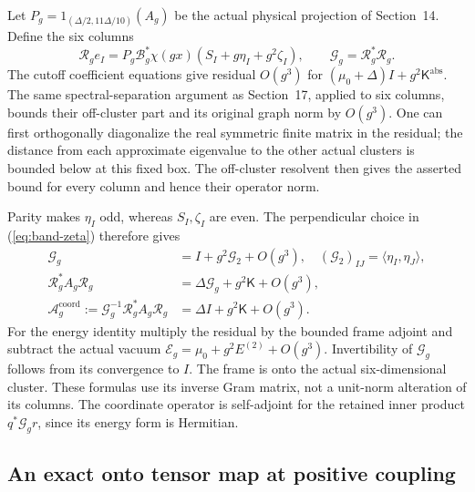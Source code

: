 Let $P_g=1_{(\Delta/2,11\Delta/10)}(A_g)$ be the actual physical
projection of Section~14. Define the six columns
\begin{equation}\label{eq:band-raw-frame}
 \mathcal R_g e_I=P_g\mathcal B_g^*\chi(gx)
                         (S_I+g\eta_I+g^2\zeta_I),\qquad
 \mathcal G_g=\mathcal R_g^*\mathcal R_g.
\end{equation}
The cutoff coefficient equations give residual $O(g^3)$ for
$(\mu_0+\Delta)I+g^2\mathsf K^{\mathrm{abs}}$.
The same spectral-separation argument as Section~17, applied to
six columns, bounds their off-cluster part and its original graph
norm by $O(g^3)$. One can first orthogonally diagonalize the real
symmetric finite matrix in the residual; the distance from each
approximate eigenvalue to the other actual clusters is bounded
below at this fixed box. The off-cluster resolvent then gives
the asserted bound for every column and hence their operator norm.

Parity makes $\eta_I$ odd, whereas $S_I,\zeta_I$ are even.
The perpendicular choice in (\ref{eq:band-zeta}) therefore gives
\begin{align}
 \mathcal G_g&=I+g^2\mathcal G_2+O(g^3),\quad
             (\mathcal G_2)_{IJ}=\langle\eta_I,\eta_J\rangle,\nonumber\\
 \mathcal R_g^*A_g\mathcal R_g
       &=\Delta\mathcal G_g+g^2\mathsf K+O(g^3),\nonumber\\
 \mathcal A_g^{\mathrm{coord}}
       :=\mathcal G_g^{-1}\mathcal R_g^*A_g\mathcal R_g
       &=\Delta I+g^2\mathsf K+O(g^3).
 \label{eq:band-raw-Gram-energy}
\end{align}
For the energy identity multiply the residual by the bounded frame
adjoint and subtract the actual vacuum
$\mathcal E_g=\mu_0+g^2E^{(2)}+O(g^3)$.
Invertibility of $\mathcal G_g$ follows from its convergence to $I$.
The frame is onto the actual six-dimensional cluster. These formulas
use its inverse Gram matrix, not a unit-norm alteration of its
columns. The coordinate operator is self-adjoint for the retained
inner product $q^*\mathcal G_g r$, since its energy form is Hermitian.

\subsection{An exact onto tensor map at positive coupling}

